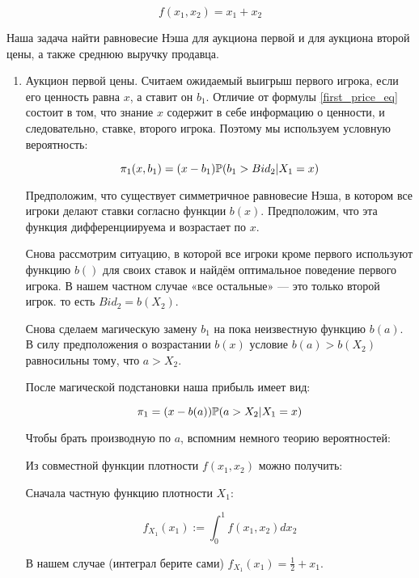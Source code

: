 \begin{equation}
f(x_{1},x_{2})=x_{1}+x_{2}
\end{equation}

Наша задача найти равновесие Нэша для аукциона первой и для аукциона второй цены, а также среднюю выручку продавца.

\begin{enumerate}
\item Аукцион первой цены. Считаем ожидаемый выигрыш первого игрока, если его ценность равна $ x $, а ставит он $ b_{1} $. Отличие от формулы \ref{first_price_eq} состоит в том, что знание $ x $ содержит в себе информацию о ценности, и следовательно, ставке, второго игрока. Поэтому мы используем условную вероятность:

\begin{equation}
\pi_{1}(x,b_{1})=(x-b_{1})\P(b_{1}>Bid_{2} |X_{1}=x)
\end{equation}

Предположим, что существует симметричное равновесие Нэша, в котором все игроки делают ставки согласно функции $ b(x) $. Предположим, что эта функция дифференциируема и возрастает по $ x $.

Снова рассмотрим ситуацию, в которой все игроки кроме первого используют функцию $ b() $ для своих ставок и найдём оптимальное поведение первого игрока. В нашем частном случае «все остальные» — это только второй игрок. то есть $ Bid_{2}=b(X_{2}) $.

Снова сделаем магическую замену $ b_{1} $ на пока неизвестную функцию $ b(a) $. В силу предположения о возрастании  $ b(x) $ условие $ b(a)>b(X_{2}) $ равносильны тому, что $ a>X_{2} $.

После магической подстановки наша прибыль имеет вид:

\begin{equation}
\pi_{1}=(x-b(a))\P(a>X_{2} |X_{1}=x)
\end{equation}


Чтобы брать производную по $a$, вспомним немного теорию вероятностей:

Из совместной функции плотности $f(x_{1}, x_{2})$ можно получить:

Сначала частную функцию плотности $X_{1}$:

\begin{equation}
f_{X_{1}}(x_{1}):=\int_{0}^{1} f(x_{1},x_{2}) dx_{2}
\end{equation}

В нашем случае (интеграл берите сами) $ f_{X_{1}}(x_{1})=\frac{1}{2}+x_{1} $.


\end{enumerate}
